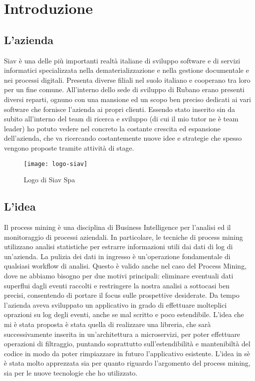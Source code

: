 
\chapter{Introduzione}

\section{L'azienda}

Siav è una delle più importanti realtà italiane di sviluppo software e di servizi informatici
specializzata nella dematerializzazione e nella gestione documentale e nei processi
digitali. Presenta diverse filiali nel suolo italiano e cooperano tra loro per un fine comune.
All'interno dello sede di sviluppo di Rubano erano presenti diversi reparti, ognuno con una mansione ed un scopo ben preciso dedicati ai vari software che fornisce l'azienda ai propri clienti.  
Essendo stato inserito sin da subito all'interno del team di ricerca e sviluppo (di cui il mio tutor ne è team leader) ho potuto vedere nel concreto la costante crescita ed espansione dell'azienda, che va ricercando costantemente nuove idee e strategie che spesso vengono proposte tramite attività di stage.

\begin{figure}[!h] 
	\centering 
	\texttt{[image: logo-siav]} 
	\caption{Logo di Siav Spa}
\end{figure}

\section{L'idea}
Il process mining è una disciplina di Business Intelligence per l’analisi ed il monitoraggio di
processi aziendali. In particolare, le tecniche di process mining utilizzano analisi statistiche per estrarre informazioni utili dai dati di log di un’azienda.
La pulizia dei dati in ingresso è un’operazione fondamentale di qualsiasi workflow di analisi.
Questo è valido anche nel caso del Process Mining, dove ne abbiamo bisogno per due motivi
principali: eliminare eventuali dati superflui dagli eventi raccolti e restringere la nostra analisi a sottocasi ben precisi, consentendo di portare il focus sulle prospettive desiderate.
Da tempo l'azienda aveva sviluppato un applicativo in grado di effettuare molteplici oprazioni su log degli eventi, anche se mal scritto e poco estendibile. L'idea che mi è stata proposta è stata quella di realizzare una libreria, che sarà successivamente inserita in un'architettura a microservizi, per poter effettuare operazioni di filtraggio, puntando soprattutto sull'estendibilità e mantenibiltà del codice in modo da poter rimpiazzare in futuro l'applicativo esistente. L'idea in sè è stata molto apprezzata sia per quanto riguardo l'argomento del process mining, sia per le nuove tecnologie che ho utilizzato. 

